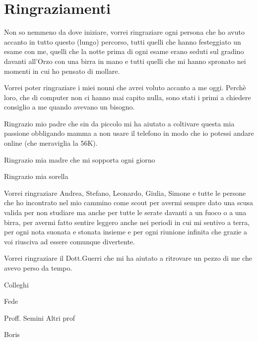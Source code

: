 \section*{Ringraziamenti}

Non so nemmeno da dove iniziare, vorrei ringraziare ogni persona che ho avuto accanto in tutto questo (lungo) percorso, tutti quelli che hanno festeggiato un esame con me, quelli che la notte prima di ogni esame erano seduti sul gradino davanti all'Orzo con una birra in mano e tutti quelli che mi hanno spronato nei momenti in cui ho pensato di mollare.

Vorrei poter ringraziare i miei nonni che avrei voluto accanto a me oggi. Perchè loro, che di computer non ci hanno mai capito nulla, sono stati i primi a chiedere consiglio a me quando avevano un bisogno.

Ringrazio mio padre che sin da piccolo mi ha aiutato a coltivare questa mia passione obbligando mamma a non usare il telefono in modo che io potessi andare online (che meraviglia la 56K).

Ringrazio mia madre che mi sopporta ogni giorno 

Ringrazio mia sorella 

Vorrei ringraziare Andrea, Stefano, Leonardo, Giulia, Simone e tutte le persone che ho incontrato nel mio cammino come scout per avermi sempre dato una scusa valida per non studiare ma anche per tutte le serate davanti a un fuoco o a una birra, per avermi fatto sentire leggero anche nei periodi in cui mi sentivo a terra, per ogni nota suonata e stonata insieme e per ogni riunione infinita che grazie a voi riusciva ad essere comunque divertente.

Vorrei ringraziare il Dott.Guerri che mi ha aiutato a ritrovare un pezzo di me che avevo perso da tempo.

Colleghi

Fede

Proff. Semini
Altri prof

Boris